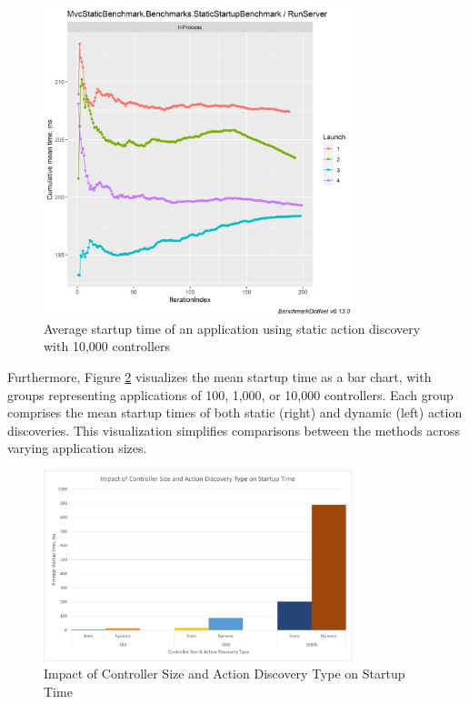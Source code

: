 \begin{figure}[H]
\centering
\includegraphics[width=0.8\textwidth]{graphics/MvcStaticBenchmark.Benchmarks.StaticStartupBenchmark-RunServer-cummean 10 000.png}
\caption{Average startup time of an application using static action discovery with 10,000 controllers}
\label{fig:static-startup-10000}
\end{figure}

Furthermore, Figure \ref{fig:startup-time-results} visualizes the mean startup time as a bar chart, with groups representing applications of 100, 1,000, or 10,000 controllers. Each group comprises the mean startup times of both static (right) and dynamic (left) action discoveries. This visualization simplifies comparisons between the methods across varying application sizes.

\begin{figure}[H]
\centering
\includegraphics[width=0.8\textwidth]{graphics/Impact of Controller Size and Action Discovery Type on Startup Time.png}
\caption{Impact of Controller Size and Action Discovery Type on Startup Time}
\label{fig:startup-time-results}
\end{figure}

